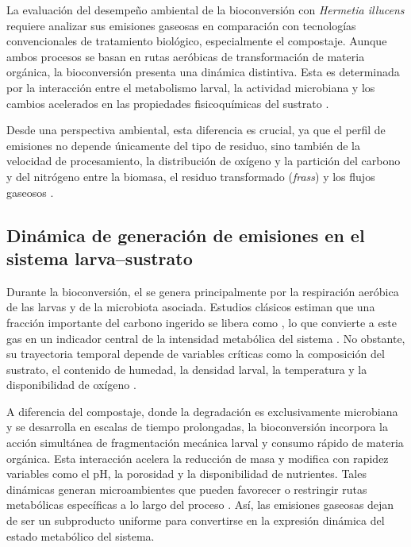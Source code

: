 La evaluación del desempeño ambiental de la bioconversión con \textit{Hermetia illucens} requiere analizar sus emisiones gaseosas en comparación con tecnologías convencionales de tratamiento biológico, especialmente el compostaje. Aunque ambos procesos se basan en rutas aeróbicas de transformación de materia orgánica, la bioconversión presenta una dinámica distintiva. Esta es determinada por la interacción entre el metabolismo larval, la actividad microbiana y los cambios acelerados en las propiedades fisicoquímicas del sustrato \parencite{rossiEstimatingDynamicsGreenhouse2024a,eriksenDynamicModellingFeed2022,parodiBioconversionEfficienciesGreenhouse2020a}. 

Desde una perspectiva ambiental, esta diferencia es crucial, ya que el perfil de emisiones no depende únicamente del tipo de residuo, sino también de la velocidad de procesamiento, la distribución de oxígeno y la partición del carbono y del nitrógeno entre la biomasa, el residuo transformado (\textit{frass}) y los flujos gaseosos \parencite{parodiBioconversionEfficienciesGreenhouse2020a,pangReducingGreenhouseGas2020,ermolaevGreenhouseGasEmissions2019}.

\subsection{Dinámica de generación de emisiones en el sistema larva--sustrato}

Durante la bioconversión, el  se genera principalmente por la respiración aeróbica de las larvas y de la microbiota asociada. Estudios clásicos estiman que una fracción importante del carbono ingerido se libera como , lo que convierte a este gas en un indicador central de la intensidad metabólica del sistema \parencite{dienerConversionOrganicMaterial2011,eriksenDynamicModellingFeed2022}. No obstante, su trayectoria temporal depende de variables críticas como la composición del sustrato, el contenido de humedad, la densidad larval, la temperatura y la disponibilidad de oxígeno \parencite{rossiEstimatingDynamicsGreenhouse2024a,bekkerImpactSubstrateMoisture2021a}.

A diferencia del compostaje, donde la degradación es exclusivamente microbiana y se desarrolla en escalas de tiempo prolongadas, la bioconversión incorpora la acción simultánea de fragmentación mecánica larval y consumo rápido de materia orgánica. Esta interacción acelera la reducción de masa y modifica con rapidez variables como el pH, la porosidad y la disponibilidad de nutrientes. Tales dinámicas generan microambientes que pueden favorecer o restringir rutas metabólicas específicas a lo largo del proceso \parencite{surendraBioconversionOrganicWastes2016,bermudez-serranoComprehensiveUtilizationBlack2023,rossiEstimatingDynamicsGreenhouse2024a}. Así, las emisiones gaseosas dejan de ser un subproducto uniforme para convertirse en la expresión dinámica del estado metabólico del sistema.



